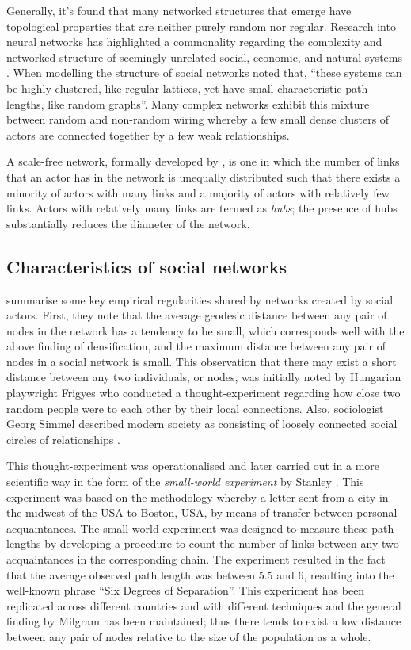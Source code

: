 Generally, it's found that many networked structures that emerge have topological properties that are neither purely random nor regular. Research into neural networks has highlighted a commonality regarding the complexity and networked structure of seemingly unrelated social, economic, and natural systems \citep{SpornsTononi2005, Sporns2010}. When modelling the structure of social networks \citet[p.~440]{WattsStrogatz1998} noted that, ``these systems can be highly clustered, like regular lattices, yet have small characteristic path lengths, like random graphs''. Many complex networks exhibit this mixture between random and non-random wiring whereby a few small dense clusters of actors are connected together by a few weak relationships.

A scale-free network, formally developed by \citet{BarabasiAlbert1999}, is one in which the number of links that an actor has in the network is unequally distributed such that there exists a minority of actors with many links and a majority of actors with relatively few links. Actors with relatively many links are termed as \emph{hubs}; the presence of hubs substantially reduces the diameter of the network.

\subsection{Characteristics of social networks}

\citet{JacksonRogers2007} summarise some key empirical regularities shared by networks created by social actors. First, they note that the average geodesic distance between any pair of nodes in the network has a tendency to be small, which corresponds well with the above finding of densification, and the maximum distance between any pair of nodes in a social network is small. This observation that there may exist a short distance between any two individuals, or nodes, was initially noted by Hungarian playwright Frigyes \citet{Karinthy1929} who conducted a thought-experiment regarding how close two random people were to each other by their local connections. Also, sociologist Georg Simmel described modern society as consisting of loosely connected social circles of relationships \citep{Simmel1950}.

This thought-experiment was operationalised and later carried out in a more scientific way in the form of the \emph{small-world experiment} by Stanley \citet{Milgram1967}. This experiment was based on the methodology whereby a letter sent from a city in the midwest of the USA to Boston, USA, by means of transfer between personal acquaintances. The small-world experiment was designed to measure these path lengths by developing a procedure to count the number of links between any two acquaintances in the corresponding chain. The experiment resulted in the fact that the average observed path length was between 5.5 and 6, resulting into the well-known phrase ``Six Degrees of Separation''. This experiment has been replicated across different countries and with different techniques and the general finding by Milgram has been maintained; thus there tends to exist a low distance between any pair of nodes relative to the size of the population as a whole.

